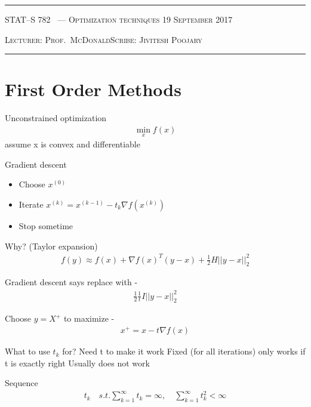 \documentclass[10pt]{article}
\newcounter{lecnum}
\newcommand{\lecturer}{Prof.\ McDonald}
\newcommand{\scribe}{Jivitesh Poojary}
\newcommand{\chtitle}{Optimization techniques}
\newcommand{\lecdate}{19 September 2017}
\begin{document}
\rule{6.5in}{1pt}

\textsc{STAT--S 782
        \hfill \thelecnum\ --- \chtitle
        \hfill \lecdate}

\textsc{Lecturer: \lecturer \hfill Scribe: \scribe}
\rule{6.5in}{1pt}


\section{First Order Methods}
Unconstrained optimization
\begin{equation}
\begin{aligned}
	\min_x f(x)
\end{aligned}
\end{equation}
assume x is convex and differentiable

Gradient descent
\begin{itemize}
	\item Choose $x^{(0)}$
	\item Iterate $x^{(k)} = x^{(k-1)} - t_k\nabla f(x^{(k)})$
	\item Stop sometime
\end{itemize}

Why? \newline
(Taylor expansion) \newline
\begin{equation}
\begin{aligned}
f(y) \approx f(x) + \nabla f(x)^{T}(y-x) + \frac{1}{2}H||y-x||^{2}_{2}
\end{aligned}
\end{equation}

Gradient descent says replace with - 
\begin{equation}
\begin{aligned}
	\frac{1}{2} \frac{1}{t} I||y-x||^{2}_{2}
\end{aligned}
\end{equation}

Choose $y=X^{+}$ to maximize - 
\begin{equation}
\begin{aligned}
	x^{+} = x - t\nabla f(x)
\end{aligned}
\end{equation}

What to use $t_k$ for?
Need t to make it work
Fixed (for all iterations)
only works if t is exactly right
Usually does not work

Sequence
\begin{equation}
\begin{aligned}
t_k \quad s.t.\sum_{k=1}^{\infty} t_k = \infty ,\quad
              \sum_{k=1}^{\infty} t^{2}_k < \infty
\end{aligned}
\end{equation}
\end{document}
